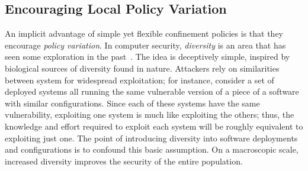 
\subsection{Encouraging Local Policy Variation}

An implicit advantage of simple yet flexible confinement policies is that they encourage
\textit{policy variation}. In computer security, \textit{diversity} is an area that has
seen some exploration in the past~\cite{somayaji2007_immunology, persaud2016_frankenssl,
matrawy2005_mitigating, neti2012_software}. The idea is deceptively simple, inspired by
biological sources of diversity found in nature. Attackers rely on similarities between
system for widespread exploitation; for instance, consider a set of deployed systems all
running the same vulnerable version of a piece of a software with similar configurations.
Since each of these systems have the same vulnerability, exploiting one system is much
like exploiting the others; thus, the knowledge and effort required to exploit each system
will be roughly equivalent to exploiting just one. The point of introducing diversity into
software deployments and configurations is to confound this basic assumption. On
a macroscopic scale, increased diversity improves the security of the entire population.

